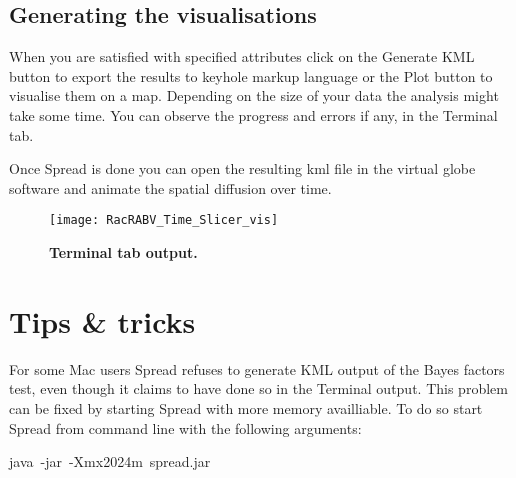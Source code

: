 \subsection{Generating the visualisations}

When you are satisfied with specified attributes click on the Generate
KML button to export the results to keyhole markup language or the
Plot button to visualise them on a map. Depending on the size of your
data the analysis might take some time. You can observe the progress
and errors if any, in the Terminal tab.

Once Spread is done you can open the resulting kml file in the virtual
globe software and animate the spatial diffusion over time.

\begin{figure}[h!]
\begin{centering}
\texttt{[image: RacRABV\_Time\_Slicer\_vis]}
\caption{
{ \footnotesize 
{\bf Terminal tab output.}
} %
}
\label{fig:12}
\par\end{centering}
\end{figure}

\section{Tips \& tricks}

For some Mac users Spread refuses to generate KML output of the Bayes
factors test, even though it claims to have done so in the Terminal
output. This problem can be fixed by starting Spread with more memory
availliable. To do so start Spread from command line with the following
arguments: 

\begin{lyxcode}
java~-jar~-Xmx2024m~spread.jar
\end{lyxcode}
